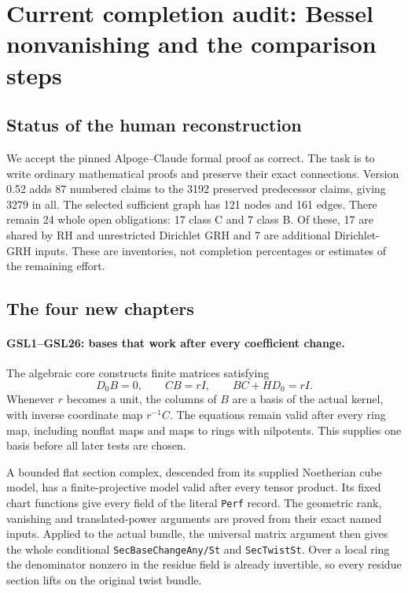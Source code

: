 \section{Current completion audit: Bessel nonvanishing and the comparison steps}
\label{sec:dependency-audit-v52}

\subsection{Status of the human reconstruction}

We accept the pinned Alpoge--Claude formal proof as correct. The task
is to write ordinary mathematical proofs and preserve their exact
connections. Version 0.52 adds 87 numbered claims to the 3192
preserved predecessor claims, giving 3279 in all. The selected
sufficient graph has 121 nodes and 161 edges. There remain 24
whole open obligations: 17 class C and 7 class B. Of these,
17 are shared by RH and unrestricted Dirichlet GRH and
7 are additional Dirichlet-GRH inputs. These are inventories,
not completion percentages or estimates of the remaining effort.

\subsection{The four new chapters}

\paragraph{GSL1--GSL26: bases that work after every coefficient change.}
The algebraic core constructs finite matrices satisfying
\[
 D_0B=0,\qquad CB=rI,\qquad BC+HD_0=rI.
\]
Whenever $r$ becomes a unit, the columns of $B$ are a basis of the
actual kernel, with inverse coordinate map $r^{-1}C$. The equations
remain valid after every ring map, including nonflat maps and maps
to rings with nilpotents. This supplies one basis before all later
tests are chosen.

A bounded flat section complex, descended from its supplied
Noetherian cube model, has a finite-projective model valid after
every tensor product. Its fixed chart functions give every field of
the literal \texttt{Perf} record. The geometric rank, vanishing
and translated-power arguments are proved from their exact named
inputs. Applied to the actual bundle, the universal matrix argument
then gives the whole conditional \texttt{Sec\allowbreak Base\allowbreak Change\allowbreak Any/\allowbreak St} and
\texttt{Sec\allowbreak Twist\allowbreak St}. Over a local ring the denominator nonzero in
the residue field is already invertible, so every residue section
lifts on the original twist bundle.

